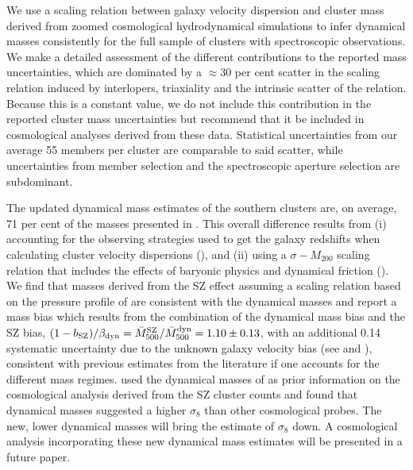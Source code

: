 We use a scaling relation between galaxy velocity dispersion and cluster mass derived from zoomed 
cosmological hydrodynamical simulations to infer dynamical masses consistently for the full sample 
of clusters with spectroscopic observations. We make a detailed assessment of the different 
contributions to the reported mass uncertainties, which are dominated by a $\approx$30 per cent 
scatter in the scaling relation induced by interlopers, triaxiality and the intrinsic scatter of 
the relation. Because this is a constant value, we do not include this contribution in the 
reported cluster mass uncertainties but recommend that it be included in cosmological analyses 
derived from these data. Statistical uncertainties from our average 55 members per cluster are 
comparable to said scatter, while uncertainties from member selection and the spectroscopic 
aperture selection are subdominant.

The updated dynamical mass estimates of the southern clusters are, on average, 71 per cent of the masses presented in \cite{sifon13}. This overall difference results from (i) accounting for the observing strategies used to get the galaxy redshifts when calculating cluster velocity dispersions (), and (ii) using a $\sigma-M_{200}$ scaling relation that includes the effects of baryonic physics and dynamical friction (). We find that masses derived from the SZ effect assuming a scaling relation based on the pressure profile of \cite{arnaud10} are consistent with the dynamical masses and report a mass bias which results from the combination of the dynamical mass bias and the SZ bias, $(1-b_{\rm SZ})/\beta_{\rm dyn} = \bar{M}_{500}^{\rm SZ} / \bar{M}_{500}^{\rm dyn}=1.10\pm0.13$, with an additional 0.14 systematic uncertainty due to the unknown galaxy velocity bias (see  and ), consistent with previous estimates from the literature if one accounts for the different mass regimes. \cite{hasselfield13} used the dynamical masses of \cite{sifon13} as prior information on the cosmological analysis derived from the SZ cluster counts and found that dynamical masses suggested a higher $\sigma_8$ than other cosmological probes. The new, lower dynamical masses will bring the estimate of $\sigma_8$ down. A cosmological analysis incorporating these new dynamical mass estimates will be presented in a future paper.

